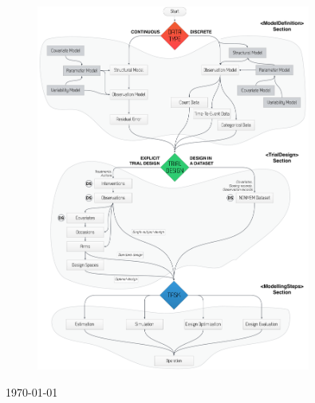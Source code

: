 \begin{titlepage}
\begin{center}
\vfill
\begin{figure}[htb]
\centering
  \includegraphics[width=90mm]{pics/Flowchart07}
\end{figure}



\vfill

{\large \today \\}

\end{center}
\end{titlepage}